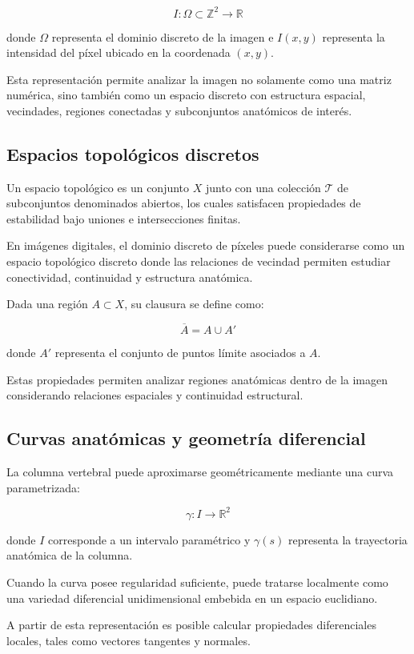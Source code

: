 \documentclass[conference]{IEEEtran}
\begin{document}
\[
I:\Omega \subset \mathbb{Z}^2 \rightarrow \mathbb{R}
\]

donde $\Omega$ representa el dominio discreto de la imagen e $I(x,y)$ representa la intensidad del píxel ubicado en la coordenada $(x,y)$.

Esta representación permite analizar la imagen no solamente como una matriz numérica, sino también como un espacio discreto con estructura espacial, vecindades, regiones conectadas y subconjuntos anatómicos de interés.

\subsection{Espacios topológicos discretos}

Un espacio topológico es un conjunto $X$ junto con una colección $\mathcal{T}$ de subconjuntos denominados abiertos, los cuales satisfacen propiedades de estabilidad bajo uniones e intersecciones finitas.

En imágenes digitales, el dominio discreto de píxeles puede considerarse como un espacio topológico discreto donde las relaciones de vecindad permiten estudiar conectividad, continuidad y estructura anatómica.

Dada una región $A \subset X$, su clausura se define como:

\[
\overline{A}=A \cup A'
\]

donde $A'$ representa el conjunto de puntos límite asociados a $A$.

Estas propiedades permiten analizar regiones anatómicas dentro de la imagen considerando relaciones espaciales y continuidad estructural.

\subsection{Curvas anatómicas y geometría diferencial}

La columna vertebral puede aproximarse geométricamente mediante una curva parametrizada:

\[
\gamma:I\rightarrow \mathbb{R}^2
\]

donde $I$ corresponde a un intervalo paramétrico y $\gamma(s)$ representa la trayectoria anatómica de la columna.

Cuando la curva posee regularidad suficiente, puede tratarse localmente como una variedad diferencial unidimensional embebida en un espacio euclidiano.

A partir de esta representación es posible calcular propiedades diferenciales locales, tales como vectores tangentes y normales.
\end{document}
